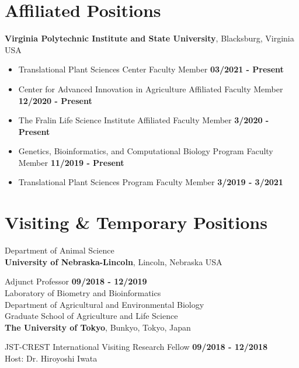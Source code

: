 \documentclass[margin,line,10pt]{res}
\begin{document}
\begin{resume}
\vspace{0.4cm}
\section{\sc Affiliated Positions}
{\bf Virginia Polytechnic Institute and State University}, Blacksburg, Virginia USA

\begin{itemize}
  \item Translational Plant Sciences Center Faculty Member  \hfill {\bf 03/2021 - Present}\\
  \item Center for Advanced Innovation in Agriculture Affiliated Faculty Member  \hfill {\bf 12/2020 - Present}\\
  \item The Fralin Life Science Institute Affiliated Faculty Member  \hfill {\bf 3/2020 - Present}\\
\item Genetics, Bioinformatics, and Computational Biology Program Faculty Member  \hfill {\bf 11/2019 - Present}\\
\item Translational Plant Sciences Program Faculty Member  \hfill {\bf 3/2019 - 3/2021}\\
\end{itemize}




\vspace{0.4cm}
\section{\sc Visiting \& Temporary Positions}
Department of Animal Science\\
{\bf University of Nebraska-Lincoln}, Lincoln, Nebraska USA
\vspace{-.35cm}

Adjunct Professor  \hfill {\bf 09/2018 - 12/2019}\\ 



Laboratory of Biometry and Bioinformatics\\
Department of Agricultural and Environmental Biology \\
Graduate School of Agriculture and Life Science \\
{\bf The University of Tokyo}, Bunkyo, Tokyo, Japan
\vspace{-.35cm}

JST-CREST International Visiting Research Fellow  \hfill {\bf 09/2018 - 12/2018}\\
Host: Dr. Hiroyoshi Iwata



\end{resume}
\end{document}
